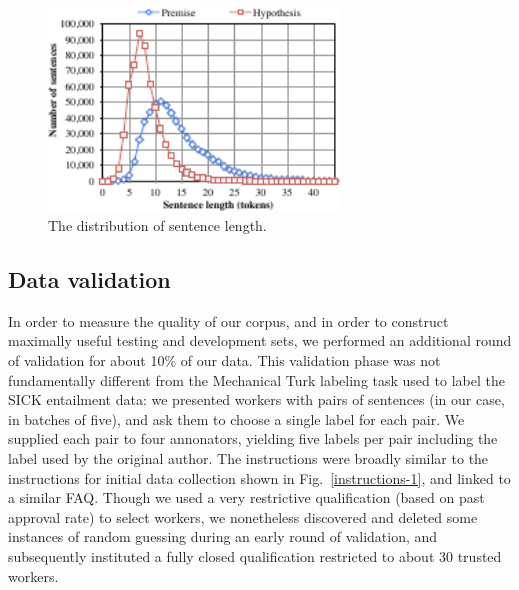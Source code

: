 \begin{figure}
\center
\includegraphics[width=3.05in]{length_dist}
\caption{\label{length-dist}The distribution of sentence length.} 
\end{figure}

\subsection{Data validation}

In order to measure the quality of our corpus, and in order to construct maximally useful testing and development sets, we performed an additional round of validation for about 10\% of our data.
This validation phase was not fundamentally different from the Mechanical Turk labeling task used to label the SICK entailment data: we presented workers with pairs of sentences (in our case, in batches of five), and ask them to choose a single label for each pair. We supplied each pair to four annonators, yielding five labels per pair including the label used by the original author. The instructions were broadly similar to the instructions for initial data collection shown in Fig.~\ref{instructions-1}, and linked to a similar FAQ. Though we used a very restrictive qualification (based on past approval rate) to select workers, we nonetheless discovered and deleted some instances of random guessing during an early round of validation, and subsequently instituted a fully closed qualification restricted to about 30 trusted workers.

